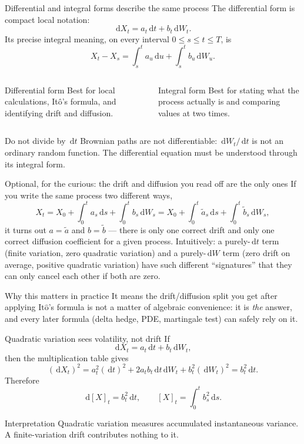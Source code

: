 \documentclass[handout,10pt,aspectratio=169]{beamer}
\newcommand{\dd}{\,\mathrm d}
\newcommand{\Ito}{\mathrm{It\hat{o}}}
\begin{document}
\begin{frame}{Differential and integral forms describe the same process}
\small
The differential form is compact local notation:
\[
\boxed{\dd X_t=a_t\dd t+b_t\dd W_t.}
\]
Its precise integral meaning, on every interval \(0\leq s\leq t\leq T\), is
\[
\boxed{
X_t-X_s=\int_s^t a_u\dd u+\int_s^t b_u\dd W_u.}
\]
\begin{columns}[T,onlytextwidth]
\begin{block}{Differential form}
Best for local calculations, It\^o's formula, and identifying drift and
diffusion.
\end{block}
\begin{exampleblock}{Integral form}
Best for stating what the process actually is and comparing values at two
times.
\end{exampleblock}
\end{columns}
\begin{alertblock}{Do not divide by \(\dd t\)}
Brownian paths are not differentiable: \(\dd W_t/\dd t\) is not an ordinary
random function. The differential equation must be understood through its
integral form.
\end{alertblock}
\end{frame}

\begin{frame}{Optional, for the curious: the drift and diffusion you read off are the only ones}
\small
If you write the same process two different ways,
\[
X_t=X_0+\int_0^t a_s\dd s+\int_0^t b_s\dd W_s
    =X_0+\int_0^t \widetilde a_s\dd s
          +\int_0^t \widetilde b_s\dd W_s,
\]
it turns out \(a=\widetilde a\) and \(b=\widetilde b\) --- there is only one
correct drift and only one correct diffusion coefficient for a given
process. Intuitively: a purely-\(\dd t\) term (finite variation, zero
quadratic variation) and a purely-\(\dd W\) term (zero drift on average,
positive quadratic variation) have such different ``signatures'' that they
can only cancel each other if both are zero.
\begin{block}{Why this matters in practice}
It means the drift/diffusion split you get after applying \(\Ito\)'s
formula is not a matter of algebraic convenience: it is \emph{the} answer,
and every later formula (delta hedge, PDE, martingale test) can safely rely
on it.
\end{block}
\end{frame}

\begin{frame}{Quadratic variation sees volatility, not drift}
If
\[
\dd X_t=a_t\dd t+b_t\dd W_t,
\]
then the multiplication table gives
\[
(\dd X_t)^2
=a_t^2(\dd t)^2+2a_tb_t\dd t\dd W_t+b_t^2(\dd W_t)^2
=b_t^2\dd t.
\]
Therefore
\[
\boxed{\dd[X]_t=b_t^2\dd t,\qquad [X]_t=\int_0^t b_s^2\dd s.}
\]
\begin{block}{Interpretation}
Quadratic variation measures accumulated instantaneous variance. A finite-variation drift contributes nothing to it.
\end{block}
\end{frame}
\end{document}
